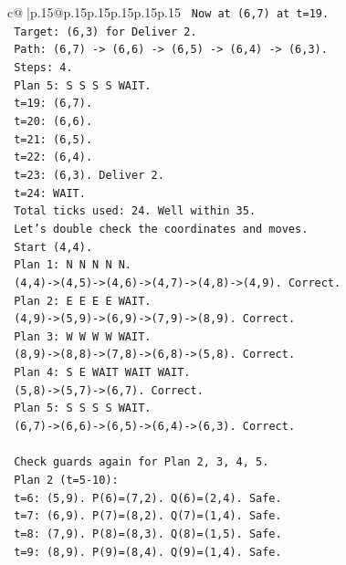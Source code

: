 \documentclass{article}
\begin{document}
{\begin{supertabular}{c@{$\;$}|p{.15\linewidth}@{}p{.15\linewidth}p{.15\linewidth}p{.15\linewidth}p{.15\linewidth}p{.15\linewidth}}
{{{\texttt{   Now at (6,7) at t=19.} \\
\texttt{   Target: (6,3) for Deliver 2.} \\
\texttt{   Path: (6,7) {-}> (6,6) {-}> (6,5) {-}> (6,4) {-}> (6,3).} \\
\texttt{   Steps: 4.} \\
\texttt{   Plan 5: S S S S WAIT.} \\
\texttt{   t=19: (6,7).} \\
\texttt{   t=20: (6,6).} \\
\texttt{   t=21: (6,5).} \\
\texttt{   t=22: (6,4).} \\
\texttt{   t=23: (6,3). Deliver 2.} \\
\texttt{   t=24: WAIT.} \\
\texttt{   Total ticks used: 24. Well within 35.} \\
\texttt{   Let's double check the coordinates and moves.} \\
\texttt{   Start (4,4).} \\
\texttt{   Plan 1: N N N N N.} \\
\texttt{   (4,4){-}>(4,5){-}>(4,6){-}>(4,7){-}>(4,8){-}>(4,9). Correct.} \\
\texttt{   Plan 2: E E E E WAIT.} \\
\texttt{   (4,9){-}>(5,9){-}>(6,9){-}>(7,9){-}>(8,9). Correct.} \\
\texttt{   Plan 3: W W W W WAIT.} \\
\texttt{   (8,9){-}>(8,8){-}>(7,8){-}>(6,8){-}>(5,8). Correct.} \\
\texttt{   Plan 4: S E WAIT WAIT WAIT.} \\
\texttt{   (5,8){-}>(5,7){-}>(6,7). Correct.} \\
\texttt{   Plan 5: S S S S WAIT.} \\
\texttt{   (6,7){-}>(6,6){-}>(6,5){-}>(6,4){-}>(6,3). Correct.} \\
\\ 
\texttt{   Check guards again for Plan 2, 3, 4, 5.} \\
\texttt{   Plan 2 (t=5{-}10):} \\
\texttt{   t=6: (5,9). P(6)=(7,2). Q(6)=(2,4). Safe.} \\
\texttt{   t=7: (6,9). P(7)=(8,2). Q(7)=(1,4). Safe.} \\
\texttt{   t=8: (7,9). P(8)=(8,3). Q(8)=(1,5). Safe.} \\
\texttt{   t=9: (8,9). P(9)=(8,4). Q(9)=(1,4). Safe.} \\
}}}
\end{supertabular}}
\end{document}
